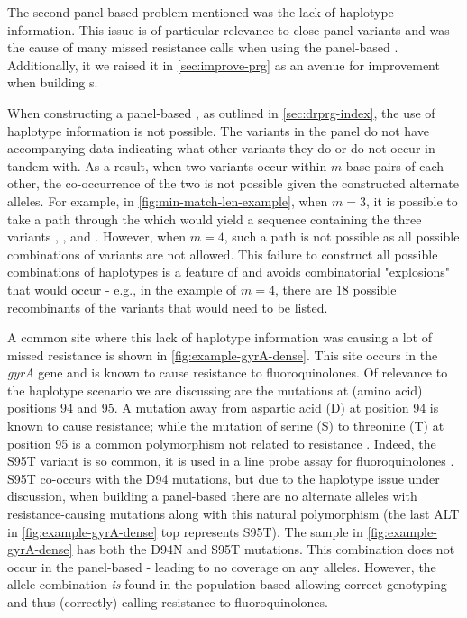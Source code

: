 The second panel-based \prg{} problem mentioned was the lack of haplotype information. This issue is of particular relevance to close panel variants and was the cause of many missed resistance calls when using the panel-based \prg{}. Additionally, it we raised it in \autoref{sec:improve-prg} as an avenue for improvement when building \prg{}s.

When constructing a panel-based \prg{}, as outlined in \autoref{sec:drprg-index}, the use of haplotype information is not possible. The variants in the panel do not have accompanying data indicating what other variants they do or do not occur in tandem with. As a result, when two variants occur within $m$ base pairs of each other, the co-occurrence of the two is not possible given the constructed alternate alleles. For example, in \autoref{fig:min-match-len-example}, when $m=3$, it is possible to take a path through the \prg{} which would yield a sequence containing the three variants , , and . However, when $m=4$, such a path is not possible as all possible combinations of variants are not allowed. This failure to construct all possible combinations of haplotypes is a feature of \makeprg{} and avoids combinatorial "explosions" that would occur - e.g., in the example of $m=4$, there are 18 possible recombinants of the variants that would need to be listed.

A common site where this lack of haplotype information was causing a lot of missed resistance is shown in \autoref{fig:example-gyrA-dense}. This site occurs in the \textit{gyrA} gene and is known to cause resistance to fluoroquinolones. Of relevance to the haplotype scenario we are discussing are the mutations at (amino acid) positions 94 and 95. A mutation away from aspartic acid (D) at position 94 is known to cause resistance; while the mutation of serine (S) to threonine (T) at position 95 is a common polymorphism not related to resistance \cite{sreevatsan1997,Giannoni2005,singhal2016}. Indeed, the S95T variant is so common, it is used in a line probe assay for fluoroquinolones \cite{Giannoni2005}. S95T co-occurs with the D94 mutations, but due to the haplotype issue under discussion, when building a panel-based \prg{} there are no alternate alleles with resistance-causing mutations along with this natural polymorphism (the last ALT in \autoref{fig:example-gyrA-dense} top represents S95T). The sample in \autoref{fig:example-gyrA-dense} has both the D94N and S95T mutations. This combination does not occur in the panel-based \prg{} - leading to no coverage on any alleles. However, the allele combination \emph{is} found in the population-based \prg{} allowing correct genotyping and thus (correctly) calling resistance to fluoroquinolones.

